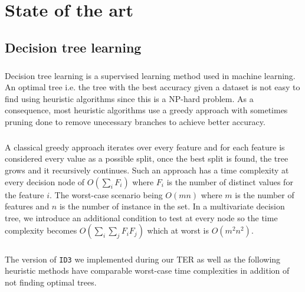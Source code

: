 \documentclass[12pt]{report}
\theoremstyle{definition}
\theoremstyle{definition}
\theoremstyle{definition}
\begin{document}
\chapter{State of the art}
\section{Decision tree learning} 
\paragraph{} Decision tree learning is a supervised learning method used in machine learning. An optimal tree i.e.
the tree with the best accuracy given a dataset is not easy to find using heuristic algorithms since this is
a NP-hard problem. As a consequence, most heuristic algorithms use a greedy approach with sometimes pruning
done to remove unecessary branches to achieve better accuracy.

\paragraph{} A classical greedy approach iterates over every feature and for each feature is considered every
value as a possible split, once the best split is found, the tree grows and it recursively continues.
Such an approach has a time complexity at every decision node of $O(\sum_{i}^{}F_i)$ where $F_i$ is the number
of distinct values for the feature $i$. The worst-case scenario being $O(mn)$ where $m$ is the number of
features and $n$ is the number of instance in the set. In a multivariate decision tree, we introduce an
additional condition to test at every node so the time complexity becomes $O(\sum_{i}\sum_{j}F_iF_j)$ which at
worst is $O(m^2n^2)$.

\paragraph{} The version of \texttt{ID3} we implemented during our TER as well as the following heuristic methods have
comparable worst-case time complexities in addition of not finding optimal trees.

\newpage
\end{document}

